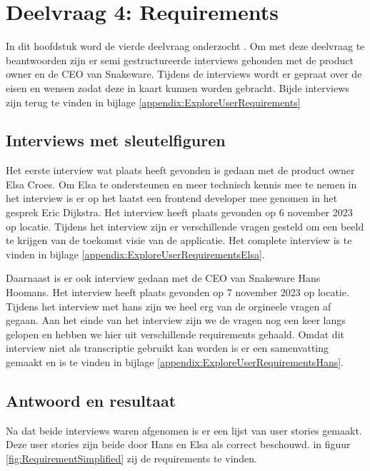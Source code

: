 \section{Deelvraag 4: Requirements}
In dit hoofdstuk word de vierde deelvraag onderzocht \SubquestionFour.
Om met deze deelvraag te beantwoorden zijn er semi gestructureerde interviews gehouden met de product owner en de CEO van Snakeware.
Tijdens de interviews wordt er gepraat over de eisen en wensen zodat deze in kaart kunnen worden gebracht.
Bijde interviews zijn terug te vinden in bijlage \ref{appendix:ExploreUserRequirements}

\subsection{Interviews met sleutelfiguren}
Het eerste interview wat plaats heeft gevonden is gedaan met de product owner Elsa Croes.
Om Elsa te ondersteunen en meer technisch kennis mee te nemen in het interview is er op het laatst een frontend developer mee genomen in het gesprek Eric Dijkstra.
Het interview heeft plaats gevonden op 6 november 2023 op locatie.
Tijdens het interview zijn er verschillende vragen gesteld om een beeld te krijgen van de toekomst visie van de applicatie.
Het complete interview is te vinden in bijlage \ref{appendix:ExploreUserRequirementsElsa}.

\whitespace
Daarnaast is er ook interview gedaan met de CEO van Snakeware Hans Hoomans.
Het interview heeft plaats gevonden op 7 november 2023 op locatie.
Tijdens het interview met hans zijn we heel erg van de orgineele vragen af gegaan. 
Aan het einde van het interview zijn we de vragen nog een keer langs gelopen en hebben we hier uit verschillende requirements gehaald.
Omdat dit interview niet als transcriptie gebruikt kan worden is er een samenvatting gemaakt en is te vinden in bijlage \ref{appendix:ExploreUserRequirementsHans}.

%

\subsection{Antwoord en resultaat}
Na dat beide interviews waren afgenomen is er een lijst van user stories gemaakt.
Deze user stories zijn beide door Hans en Elsa als correct beschouwd.
in figuur \ref{fig:RequirementSimplified} zij de requirements te vinden.


